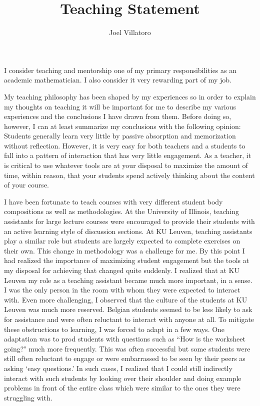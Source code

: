 \documentclass{article}
\title{Teaching Statement}
\author{Joel Villatoro}
\date{}
\begin{document}
\vspace{-0.5in}
\maketitle


I consider teaching and mentorship one of my primary responsibilities as an academic mathematician. I also consider it very rewarding part of my job.




My teaching philosophy has been shaped by my experiences so in order to explain my thoughts on teaching it will be important for me to describe my various experiences and the conclusions I have drawn from them. Before doing so, however, I can at least summarize my conclusions with the following opinion: Students generally learn very little by passive absorption and memorization without reflection. However, it is very easy for both teachers and a students to fall into a pattern of interaction that has very little engagement. As a teacher, it is critical to use whatever tools are at your disposal to maximize the amount of time, within reason, that your students spend actively thinking about the content of your course.

I have been fortunate to teach courses with very different student body compositions as well as methodologies. 
At the University of Illinois, teaching assistants for large lecture courses were encouraged to provide their students with an active learning style of discussion sections. At KU Leuven, teaching assistants play a similar role but students are largely expected to complete exercises on their own. 
This change in methodology was a challenge for me. 
By this point I had realized the importance of maximizing student engagement but the tools at my disposal for achieving that changed quite suddenly. 
I realized that at KU Leuven my role as a teaching assistant became much more important, in a sense. 
I was the only person in the room with whom they were expected to interact with. 
Even more challenging, I observed that the culture of the students at KU Leuven was much more reserved. Belgian students seemed to be less likely to ask for assistance and were often reluctant to interact with anyone at all. To mitigate these obstructions to learning, I was forced to adapt in a few ways. One adaptation was to prod students with questions such as ``How is the worksheet going?" much more frequently. This was often successful but some students were still often reluctant to engage or were embarrassed to be seen by their peers as asking `easy questions.' In such cases, I realized that I could still indirectly interact with such students by looking over their shoulder and doing example problems in front of the entire class which were similar to the ones they were struggling with.
\end{document}
